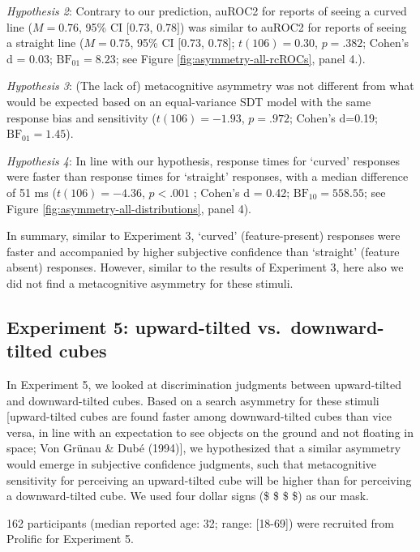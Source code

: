\documentclass[12pt,twoside]{reedthesis}
\begin{document}
\emph{Hypothesis 2}: Contrary to our prediction, auROC2 for reports of seeing a curved line (\(M = 0.76\), 95\% CI \([0.73\), \(0.78]\)) was similar to auROC2 for reports of seeing a straight line (\(M = 0.75\), 95\% CI \([0.73\), \(0.78]\); \(t(106) = 0.30\), \(p = .382\); Cohen's d = 0.03; \(\mathrm{BF}_{\textrm{01}} = 8.23\); see Figure \ref{fig:asymmetry-all-rcROCs}, panel 4.).

\emph{Hypothesis 3}: (The lack of) metacognitive asymmetry was not different from what would be expected based on an equal-variance SDT model with the same response bias and sensitivity (\(t(106) = -1.93\), \(p = .972\); Cohen's d=0.19; \(\mathrm{BF}_{\textrm{01}} = 1.45\)).

\emph{Hypothesis 4}: In line with our hypothesis, response times for `curved' responses were faster than response times for `straight' responses, with a median difference of 51 ms (\(t(106) = -4.36\), \(p < .001\) ; Cohen's d = 0.42; \(\mathrm{BF}_{\textrm{10}} = 558.55\); see Figure \ref{fig:asymmetry-all-distributions}, panel 4).

In summary, similar to Experiment 3, `curved' (feature-present) responses were faster and accompanied by higher subjective confidence than `straight' (feature absent) responses. However, similar to the results of Experiment 3, here also we did not find a metacognitive asymmetry for these stimuli.

\hypertarget{experiment-5-upward-tilted-vs.-downward-tilted-cubes}{%
\subsection{Experiment 5: upward-tilted vs.~downward-tilted cubes}\label{experiment-5-upward-tilted-vs.-downward-tilted-cubes}}

In Experiment 5, we looked at discrimination judgments between upward-tilted and downward-tilted cubes. Based on a search asymmetry for these stimuli {[}upward-tilted cubes are found faster among downward-tilted cubes than vice versa, in line with an expectation to see objects on the ground and not floating in space; Von Grünau \& Dubé (1994){]}, we hypothesized that a similar asymmetry would emerge in subjective confidence judgments, such that metacognitive sensitivity for perceiving an upward-tilted cube will be higher than for perceiving a downward-tilted cube. We used four dollar signs (\$ \$ \$ \$) as our mask.

162 participants (median reported age: 32; range: {[}18-69{]}) were recruited from Prolific for Experiment 5.
\end{document}
